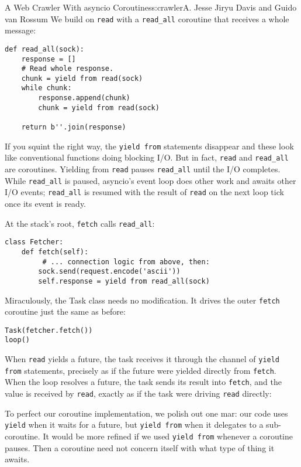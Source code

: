\begin{aosachapter}{A Web Crawler With asyncio Coroutines}{s:crawler}{A. Jesse Jiryu Davis and Guido van Rossum}
We build on \texttt{read} with a \texttt{read\_all} coroutine that
receives a whole message:

\begin{verbatim}
def read_all(sock):
    response = []
    # Read whole response.
    chunk = yield from read(sock)
    while chunk:
        response.append(chunk)
        chunk = yield from read(sock)

    return b''.join(response)
\end{verbatim}

If you squint the right way, the \texttt{yield from} statements
disappear and these look like conventional functions doing blocking I/O.
But in fact, \texttt{read} and \texttt{read\_all} are coroutines.
Yielding from \texttt{read} pauses \texttt{read\_all} until the I/O
completes. While \texttt{read\_all} is paused, asyncio's event loop does
other work and awaits other I/O events; \texttt{read\_all} is resumed
with the result of \texttt{read} on the next loop tick once its event is
ready.

At the stack's root, \texttt{fetch} calls \texttt{read\_all}:

\begin{verbatim}
class Fetcher:
    def fetch(self):
         # ... connection logic from above, then:
        sock.send(request.encode('ascii'))
        self.response = yield from read_all(sock)
\end{verbatim}

Miraculously, the Task class needs no modification. It drives the outer
\texttt{fetch} coroutine just the same as before:

\begin{verbatim}
Task(fetcher.fetch())
loop()
\end{verbatim}

When \texttt{read} yields a future, the task receives it through the
channel of \texttt{yield from} statements, precisely as if the future
were yielded directly from \texttt{fetch}. When the loop resolves a
future, the task sends its result into \texttt{fetch}, and the value is
received by \texttt{read}, exactly as if the task were driving
\texttt{read} directly:


To perfect our coroutine implementation, we polish out one mar: our code
uses \texttt{yield} when it waits for a future, but \texttt{yield from}
when it delegates to a sub-coroutine. It would be more refined if we
used \texttt{yield from} whenever a coroutine pauses. Then a coroutine
need not concern itself with what type of thing it awaits.


\end{aosachapter}
